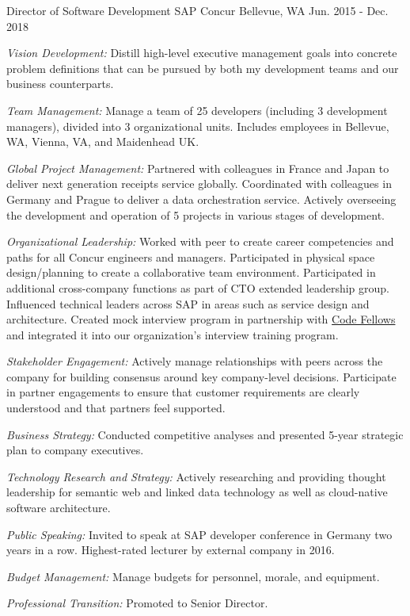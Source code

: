 \begin{cventries}
\cventry
{Director of Software Development} %
{SAP Concur} %
{Bellevue, WA} %
{Jun. 2015 - Dec. 2018} %
{ %
\begin{cvitems}
\item {\emph{Vision Development:} Distill high-level executive management goals into concrete problem definitions that can be pursued by both my development teams and our business counterparts.}
\item {\emph{Team Management:} Manage a team of 25 developers (including 3 development managers), divided into 3 organizational units. Includes employees in Bellevue, WA, Vienna, VA, and Maidenhead UK.}
\item {\emph{Global Project Management:} Partnered with colleagues in France and Japan to deliver next generation receipts service globally. Coordinated with colleagues in Germany and Prague to deliver a data orchestration service. Actively overseeing the development and operation of 5 projects in various stages of development.}
\item {\emph{Organizational Leadership:} Worked with peer to create career competencies and paths for all Concur engineers and managers. Participated in physical space design/planning to create a collaborative team environment. Participated in additional cross-company functions as part of CTO extended leadership group. Influenced technical leaders across SAP in areas such as service design and architecture. Created mock interview program in partnership with \href{https://www.codefellows.org/}{Code Fellows} and integrated it into our organization’s interview training program.}
\item {\emph{Stakeholder Engagement:} Actively manage relationships with peers across the company for building consensus around key company-level decisions. Participate in partner engagements to ensure that customer requirements are clearly understood and that partners feel supported.}
\item {\emph{Business Strategy:} Conducted competitive analyses and presented 5-year strategic plan to company executives.}
\item {\emph{Technology Research and Strategy:} Actively researching and providing thought leadership for semantic web and linked data technology as well as cloud-native software architecture. }
\item {\emph{Public Speaking:} Invited to speak at SAP developer conference in Germany two years in a row. Highest-rated lecturer by external company in 2016.}
\item {\emph{Budget Management:} Manage budgets for personnel, morale, and equipment.}
\item {\emph{Professional Transition:} Promoted to Senior Director.}
\end{cvitems}
}


\end{cventries}
